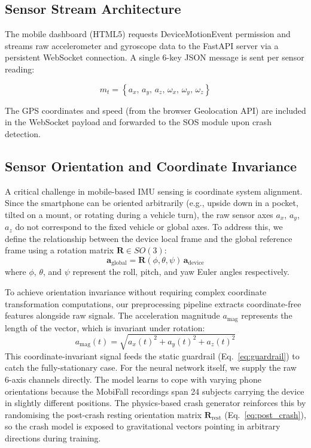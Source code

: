 \documentclass[journal]{IEEEtran}
\begin{document}
\subsection{Sensor Stream Architecture}

The mobile dashboard (HTML5) requests DeviceMotionEvent permission and streams
raw accelerometer and gyroscope data to the FastAPI server via a persistent
WebSocket connection. A single 6-key JSON message is sent per sensor reading:

\begin{equation}
  m_t = \left\{ a_x, \, a_y, \, a_z, \, \omega_x, \, \omega_y, \, \omega_z \right\}
  \label{eq:ws_message}
\end{equation}

The GPS coordinates and speed (from the browser Geolocation API) are included
in the WebSocket payload and forwarded to the SOS module upon crash detection.

\subsection{Sensor Orientation and Coordinate Invariance}

A critical challenge in mobile-based IMU sensing is coordinate system alignment. Since the smartphone can be oriented arbitrarily (e.g., upside down in a pocket, tilted on a mount, or rotating during a vehicle turn), the raw sensor axes $a_x$, $a_y$, $a_z$ do not correspond to the fixed vehicle or global axes. To address this, we define the relationship between the device local frame and the global reference frame using a rotation matrix $\mathbf{R} \in SO(3)$:
\begin{equation}
  \mathbf{a}_{\text{global}} = \mathbf{R}(\phi, \theta, \psi) \, \mathbf{a}_{\text{device}}
  \label{eq:coordinate_transform}
\end{equation}
where $\phi$, $\theta$, and $\psi$ represent the roll, pitch, and yaw Euler angles respectively. 

To achieve orientation invariance without requiring complex coordinate transformation computations, our preprocessing pipeline extracts coordinate-free features alongside raw signals. The acceleration magnitude $a_{\text{mag}}$ represents the length of the vector, which is invariant under rotation:
\begin{equation}
  a_{\text{mag}}(t) = \sqrt{a_x(t)^2 + a_y(t)^2 + a_z(t)^2}
  \label{eq:magnitude}
\end{equation}
This coordinate-invariant signal feeds the static guardrail (Eq.~\ref{eq:guardrail}) to
catch the fully-stationary case. For the neural network itself, we supply the raw
6-axis channels directly. The model learns to cope with varying phone orientations
because the MobiFall recordings span 24 subjects carrying the device in slightly
different positions. The physics-based crash generator reinforces this by randomising
the post-crash resting orientation matrix $\mathbf{R}_{\text{rest}}$ (Eq.~\ref{eq:post_crash}),
so the crash model is exposed to gravitational vectors pointing in arbitrary directions
during training.
\end{document}
